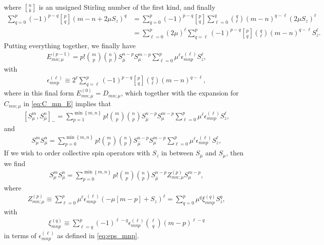 \documentclass[aps,notitlepage,nofootinbib,11pt]{revtex4-1}
\newcommand{\p}[1]{\left(#1\right)} %
\renewcommand{\sp}[1]{\left[#1\right]} %
\renewcommand{\set}[1]{\left\{#1\right\}} %
\newcommand{\bmu}{{\bar\mu}}
\newcommand{\1}{\mathds{1}}
\begin{document}
where ${ n \brack k }$ is an unsigned Stirling number of the first
kind, and finally
\begin{align}
  \sum_{q=0}^p \p{-1}^{p-q} { p \brack q } \p{m-n+2\mu S_z}^q
  &= \sum_{q=0}^p \p{-1}^{p-q} { p \brack q } \sum_{\ell=0}^q
  { q \choose \ell } \p{m-n}^{q-\ell} \p{2\mu S_z}^\ell \\
  &= \sum_{\ell=0}^p \p{2\mu}^\ell \sum_{q=\ell}^p \p{-1}^{p-q}
  { p \brack q } { q \choose \ell } \p{m-n}^{q-\ell} S_z^\ell.
\end{align}
Putting everything together, we finally have
\begin{align}
  E_{mn;\mu}^{(p-1)}
  = p! { m \choose p } { n \choose p }
  S_\bmu^{n-p} S_\mu^{m-p} \sum_{\ell=0}^p
  \mu^\ell \epsilon_{mnp}^{(\ell)} S_z^\ell,
\end{align}
with
\begin{align}
  \epsilon_{mnp}^{(\ell)}
  \equiv 2^\ell \sum_{q=\ell}^p \p{-1}^{p-q}
  { p \brack q } { q \choose \ell } \p{m-n}^{q-\ell},
  \label{eq:eps_mnp}
\end{align}
where in this final form $E_{mn;\mu}^{(0)} = D_{mn;\mu}$, which
together with the expansion for $C_{mn;\mu}$ in \eqref{eq:C_mn_E}
implies that
\begin{align}
  \sp{S_\mu^m, S_\bmu^n}_-
  = \sum_{p=1}^{\min\set{m,n}}
  p! { m \choose p } { n \choose p } S_\bmu^{n-p} S_\mu^{m-p}
  \sum_{\ell=0}^p \mu^\ell \epsilon_{mnp}^{(\ell)} S_z^\ell,
  \label{eq:comm_mu}
\end{align}
and
\begin{align}
  S_\mu^m S_\bmu^n
  = \sum_{p=0}^{\min\set{m,n}}
  p! { m \choose p } { n \choose p } S_\bmu^{n-p} S_\mu^{m-p}
  \sum_{\ell=0}^p \mu^\ell \epsilon_{mnp}^{(\ell)} S_z^\ell,
  \label{eq:push_mu_nu}
\end{align}
If we wish to order collective spin operators with $S_z$ in between
$S_\bmu$ and $S_\mu$, then we find
\begin{align}
  S_\mu^m S_\bmu^n
  = \sum_{p=0}^{\min\set{m,n}} p! { m \choose p } { n \choose p }
  S_\bmu^{n-p} Z_{mn;\mu}^{(p)} S_\mu^{m-p},
\end{align}
where
\begin{align}
  Z_{mn;\mu}^{(p)}
  \equiv \sum_{\ell=0}^p \mu^\ell \epsilon_{mnp}^{(\ell)}
  \p{-\mu\sp{m-p} + S_z}^\ell
  = \sum_{q=0}^p \mu^q \xi_{mnp}^{(q)} S_z^q,
  \label{eq:Z_mn}
\end{align}
with
\begin{align}
  \xi_{mnp}^{(q)}
  \equiv \sum_{\ell=q}^p \p{-1}^{\ell-q}
  \epsilon_{mnp}^{(\ell)} { \ell \choose q } \p{m-p}^{\ell-q}
  \label{eq:xi_mnp}
\end{align}
in terms of $\epsilon_{mnp}^{(\ell)}$ as defined in
\eqref{eq:eps_mnp}.
\end{document}
